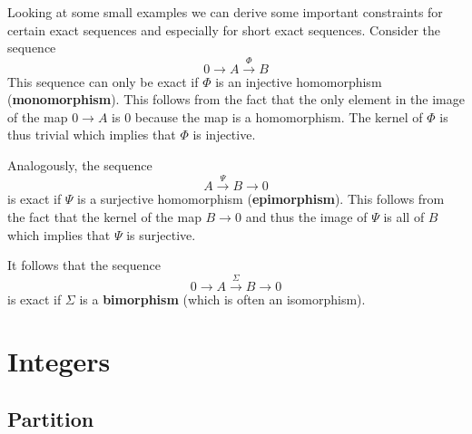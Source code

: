 	
	\begin{property}
		Looking at some small examples we can derive some important constraints for certain exact sequences and especially for short exact sequences. Consider the sequence
		\[
			0\rightarrow A\xrightarrow{\Phi} B
		\]
		This sequence can only be exact if $\Phi$ is an injective homomorphism (\textbf{monomorphism}). This follows from the fact that the only element in the image of the map $0\rightarrow A$ is 0 because the map is a homomorphism. The kernel of $\Phi$ is thus trivial which implies that $\Phi$ is injective.
		
		Analogously, the sequence
		\[
			A\xrightarrow{\Psi}B\rightarrow0
		\]
		is exact if $\Psi$ is a surjective homomorphism (\textbf{epimorphism}). This follows from the fact that the kernel of the map $B\rightarrow0$ and thus the image of $\Psi$ is all of $B$ which implies that $\Psi$ is surjective.
		
		It follows that the sequence
		\[
			0\rightarrow A\xrightarrow{\Sigma}B\rightarrow0
		\]
		is exact if $\Sigma$ is a \textbf{bimorphism} (which is often an isomorphism).
	\end{property}

\section{Integers}
\subsection{Partition}
	
